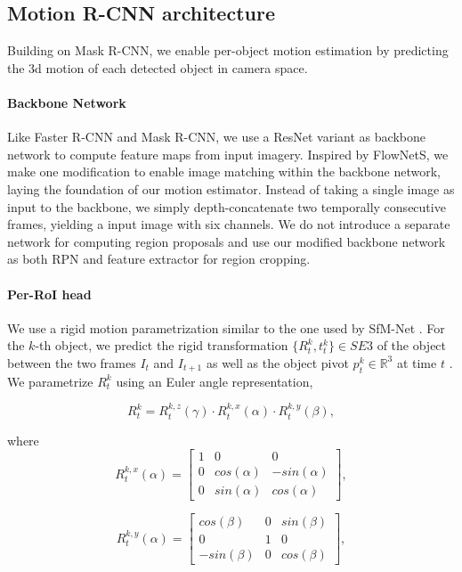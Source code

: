 
\subsection{Motion R-CNN architecture}

Building on Mask R-CNN, we enable per-object motion estimation by predicting the 3d motion of each detected object
in camera space.

\paragraph{Backbone Network}
Like Faster R-CNN and Mask R-CNN, we use a ResNet variant as backbone network to compute feature maps from input imagery.
Inspired by FlowNetS, we make one modification to enable image matching within the backbone network,
laying the foundation of our motion estimator. Instead of taking a single image as input to the backbone,
we simply depth-concatenate two temporally consecutive frames, yielding a input image with six channels.
We do not introduce a separate network for computing region proposals and use our modified backbone network
as both RPN and feature extractor for region cropping.

\paragraph{Per-RoI head}
We use a rigid motion parametrization similar to the one used by SfM-Net \cite{Byravan:2017:SNL}.
For the $k$-th object, we predict the rigid transformation $\{R_t^k, t_t^k\}\in SE3$
of the object between the two frames $I_t$ and $I_{t+1}$ as well as the object pivot $p_t^k \in \mathbb{R}^3$ at time $t$ .
We parametrize ${R_t^k}$ using an Euler angle representation,

\begin{equation}
R_t^k = R_t^{k,z}(\gamma) \cdot R_t^{k,x}(\alpha) \cdot R_t^{k,y}(\beta),
\end{equation}

where
\begin{equation}
R_t^{k,x}(\alpha) =
\begin{bmatrix}
  1 & 0 & 0 \\
  0 & cos(\alpha) & -sin(\alpha) \\
  0 & sin(\alpha) & cos(\alpha)
\end{bmatrix},
\end{equation}

\begin{equation}
R_t^{k,y}(\alpha) =
\begin{bmatrix}
  cos(\beta) & 0 & sin(\beta) \\
  0 & 1 & 0 \\
  -sin(\beta) & 0 & cos(\beta)
\end{bmatrix},
\end{equation}

